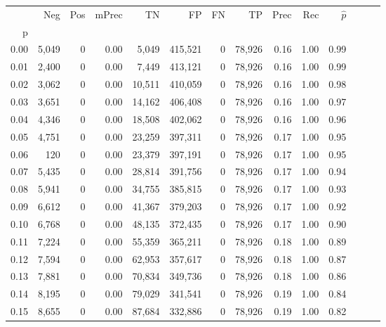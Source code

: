 \begin{tabular}{rrrrrrrrrrrrrr}
\toprule
{} &    Neg &    Pos & mPrec &       TN &       FP &      FN &      TP &  Prec &   Rec & $\hat{p}$ \\
p    &        &        &       &          &          &         &         &       &       &           \\
\midrule
0.00 &  5,049 &      0 &  0.00 &    5,049 &  415,521 &       0 &  78,926 &  0.16 &  1.00 &      0.99 \\
0.01 &  2,400 &      0 &  0.00 &    7,449 &  413,121 &       0 &  78,926 &  0.16 &  1.00 &      0.99 \\
0.02 &  3,062 &      0 &  0.00 &   10,511 &  410,059 &       0 &  78,926 &  0.16 &  1.00 &      0.98 \\
0.03 &  3,651 &      0 &  0.00 &   14,162 &  406,408 &       0 &  78,926 &  0.16 &  1.00 &      0.97 \\
0.04 &  4,346 &      0 &  0.00 &   18,508 &  402,062 &       0 &  78,926 &  0.16 &  1.00 &      0.96 \\
0.05 &  4,751 &      0 &  0.00 &   23,259 &  397,311 &       0 &  78,926 &  0.17 &  1.00 &      0.95 \\
0.06 &    120 &      0 &  0.00 &   23,379 &  397,191 &       0 &  78,926 &  0.17 &  1.00 &      0.95 \\
0.07 &  5,435 &      0 &  0.00 &   28,814 &  391,756 &       0 &  78,926 &  0.17 &  1.00 &      0.94 \\
0.08 &  5,941 &      0 &  0.00 &   34,755 &  385,815 &       0 &  78,926 &  0.17 &  1.00 &      0.93 \\
0.09 &  6,612 &      0 &  0.00 &   41,367 &  379,203 &       0 &  78,926 &  0.17 &  1.00 &      0.92 \\
0.10 &  6,768 &      0 &  0.00 &   48,135 &  372,435 &       0 &  78,926 &  0.17 &  1.00 &      0.90 \\
0.11 &  7,224 &      0 &  0.00 &   55,359 &  365,211 &       0 &  78,926 &  0.18 &  1.00 &      0.89 \\
0.12 &  7,594 &      0 &  0.00 &   62,953 &  357,617 &       0 &  78,926 &  0.18 &  1.00 &      0.87 \\
0.13 &  7,881 &      0 &  0.00 &   70,834 &  349,736 &       0 &  78,926 &  0.18 &  1.00 &      0.86 \\
0.14 &  8,195 &      0 &  0.00 &   79,029 &  341,541 &       0 &  78,926 &  0.19 &  1.00 &      0.84 \\
0.15 &  8,655 &      0 &  0.00 &   87,684 &  332,886 &       0 &  78,926 &  0.19 &  1.00 &      0.82 \\

\end{tabular}
